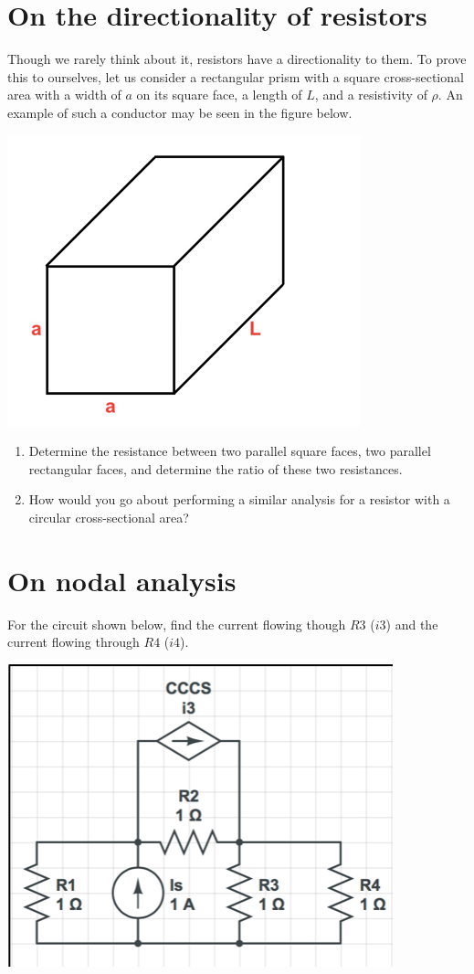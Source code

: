 \documentclass[11pt]{book}
\begin{document}
\section{On the directionality of resistors}
Though we rarely think about it, resistors have a directionality to them. To prove this to ourselves, let us consider a rectangular prism with a square cross-sectional area with a width of $a$ on its square face, a length of $L$, and a resistivity of $\rho$. An example of such a conductor may be seen in the figure below.
\begin{center}
	\includegraphics{figures/hw2.01.png}
\end{center}
\begin{enumerate}
	\item Determine the resistance between two parallel square faces, two parallel rectangular faces, and determine the ratio of these two resistances.
	\item How would you go about performing a similar analysis for a resistor with a circular cross-sectional area? 
\end{enumerate}



\section{On nodal analysis}
For the circuit shown below, find the current flowing though $R3$ ($i3$) and the current flowing through $R4$ ($i4$). 
\begin{center}
	\includegraphics{figures/hw2.02.png}
\end{center}
\end{document}
